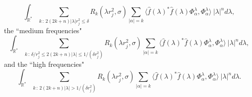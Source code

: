 \documentclass[11pt, reqno]{amsart}
\theoremstyle{plain}
\newcommand{\R}{\ensuremath{\mathbb{R_+}}}
\theoremstyle{remark}
\theoremstyle{example}
\theoremstyle{definition}
\numberwithin{equation}{section}
\def\R{\mathbb{R}}
\begin{document}
\begin{equation}\label{Low}
    \int_{\R^{*}} \sum_{k \, : \, 2(2k+n) |\lambda | r_{j}^2 \leq \delta } R_{k}(\lambda r_{j}^{2},\sigma) \sum_{|\alpha|=k} \langle \hat{f}(\lambda)^{*} \hat{f}(\lambda) \Phi_{\alpha}^{\lambda},\Phi_{\alpha}^{\lambda} \rangle \ |\lambda|^n d\lambda,
\end{equation}
the ``medium frequencies"
\begin{equation}\label{Medium}
    \int_{\R^{*}} \sum_{k \, : \, \delta / r_{j}^{2}  \leq 2(2k+n) |\lambda |  \leq 1/ (\delta r_{j}^2) } R_{k}(\lambda r_{j}^{2},\sigma) \sum_{|\alpha|=k} \langle \hat{f}(\lambda)^{*} \hat{f}(\lambda) \Phi_{\alpha}^{\lambda},\Phi_{\alpha}^{\lambda} \rangle \ |\lambda|^n d\lambda,
\end{equation}
and the ``high frequencies"
\begin{equation}\label{High}
    \int_{\R^{*}} \sum_{k \, : \,  2(2k+n) |\lambda |  >  1/ (\delta r_{j}^2) } R_{k}(\lambda r_{j}^{2},\sigma) \sum_{|\alpha|=k} \langle \hat{f}(\lambda)^{*} \hat{f}(\lambda) \Phi_{\alpha}^{\lambda},\Phi_{\alpha}^{\lambda} \rangle \ |\lambda|^n d\lambda.
\end{equation}
 
\end{document}
